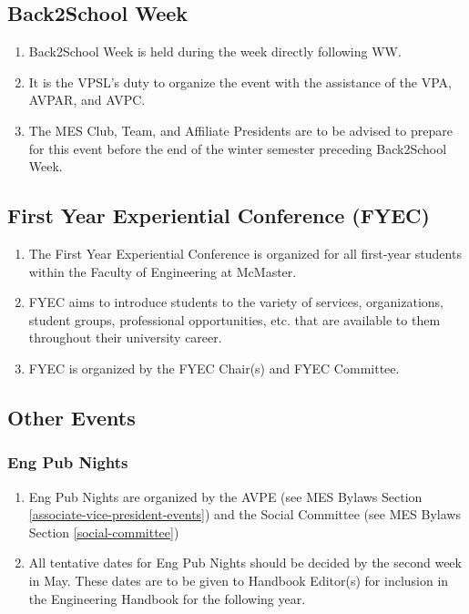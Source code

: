 \hypertarget{back2school-week}{%
 \subsection{Back2School Week}
 \label{back2school-week}}
\begin{enumerate}
 \item
  Back2School Week is held during the week directly following WW.
 \item
  It is the VPSL's duty to organize the event with the assistance of the
  VPA, AVPAR, and AVPC.
 \item
  The MES Club, Team, and Affiliate Presidents are to be advised to
  prepare for this event before the end of the winter semester preceding
  Back2School Week.

\end{enumerate}

\hypertarget{first-year-experiential-conference-fyec}{%
 \subsection{First Year Experiential Conference
  (FYEC)}
 \label{first-year-experiential-conference-fyec}}
\begin{enumerate}
 \item
  The First Year Experiential Conference is organized for all first-year
  students within the Faculty of Engineering at McMaster.
 \item
  FYEC aims to introduce students to the variety of services,
  organizations, student groups, professional opportunities, etc. that
  are available to them throughout their university career.
 \item
  FYEC is organized by the FYEC Chair(s) and FYEC Committee.

\end{enumerate}

\hypertarget{other-events}{%
 \subsection{Other Events}
 \label{other-events}}

\hypertarget{eng-pub-nights}{%
 \subsubsection{Eng Pub Nights}
 \label{eng-pub-nights}}
\begin{enumerate}
 \item
  Eng Pub Nights are organized by the AVPE (see MES Bylaws Section
  \ref{associate-vice-president-events}) and the Social Committee (see MES Bylaws Section \ref{social-committee})
 \item
  All tentative dates for Eng Pub Nights should be decided by the second
  week in May. These dates are to be given to Handbook Editor(s) for
  inclusion in the Engineering Handbook for the following year.
\end{enumerate}
